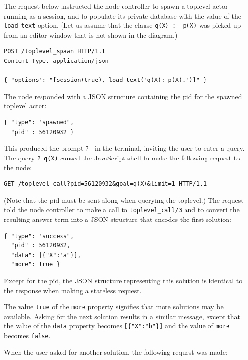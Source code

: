 The request below instructed the node controller to spawn a toplevel actor running as a session, and to populate its private database with the value of the \texttt{load\_text} option. (Let us assume that the clause \texttt{q(X)\,:-\,p(X)} was picked up from an editor window that is not shown in the diagram.)

\begin{verbatim}
POST /toplevel_spawn HTTP/1.1
Content-Type: application/json

{ "options": "[session(true), load_text('q(X):-p(X).')]" }
\end{verbatim}

\noindent The node responded with a JSON structure containing the pid for the spawned toplevel actor:

\begin{verbatim}
{ "type": "spawned",
  "pid" : 56120932 }
\end{verbatim}

\noindent This produced the prompt \texttt{?-} in the terminal, inviting the user to enter a query. The query \texttt{?-q(X)} caused the JavaScript shell to make the following request to the node:

\begin{verbatim}
GET /toplevel_call?pid=56120932&goal=q(X)&limit=1 HTTP/1.1
\end{verbatim}

\noindent (Note that the pid must be sent along when querying the toplevel.) The request told the node controller to make a call to \texttt{toplevel\_call/3} and to convert the resulting answer term into a JSON structure that encodes the first solution:

\begin{verbatim}
{ "type": "success",
  "pid" : 56120932,
  "data": [{"X":"a"}],
  "more": true }
\end{verbatim}

\noindent Except for the pid, the JSON structure representing this solution is identical to the response when making a stateless request.

The value \texttt{true} of the \texttt{more} property signifies that more solutions may be available. Asking for the next solution results in a similar message, except that the value of the \texttt{data} property becomes \texttt{[\{"X":"b"\}]} and the value of \texttt{more} becomes \texttt{false}.


When the user asked for another solution, the following request was made:

